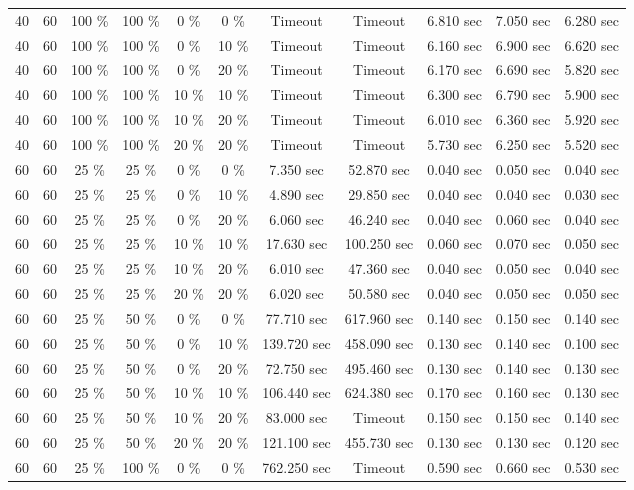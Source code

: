 \documentclass{article}
\begin{document}
\begin{longtable}[]{@{}ccccccccccc@{}}
40 & 60 & 100 \% & 100 \% & 0 \% & 0 \% & Timeout & Timeout & 6.810 sec & 7.050 sec & 6.280 sec \\
40 & 60 & 100 \% & 100 \% & 0 \% & 10 \% & Timeout & Timeout & 6.160 sec & 6.900 sec & 6.620 sec \\
40 & 60 & 100 \% & 100 \% & 0 \% & 20 \% & Timeout & Timeout & 6.170 sec & 6.690 sec & 5.820 sec \\
40 & 60 & 100 \% & 100 \% & 10 \% & 10 \% & Timeout & Timeout & 6.300 sec & 6.790 sec & 5.900 sec \\
40 & 60 & 100 \% & 100 \% & 10 \% & 20 \% & Timeout & Timeout & 6.010 sec & 6.360 sec & 5.920 sec \\
40 & 60 & 100 \% & 100 \% & 20 \% & 20 \% & Timeout & Timeout & 5.730 sec & 6.250 sec & 5.520 sec \\
60 & 60 & 25 \% & 25 \% & 0 \% & 0 \% & 7.350 sec & 52.870 sec & 0.040 sec & 0.050 sec & 0.040 sec \\
60 & 60 & 25 \% & 25 \% & 0 \% & 10 \% & 4.890 sec & 29.850 sec & 0.040 sec & 0.040 sec & 0.030 sec \\
60 & 60 & 25 \% & 25 \% & 0 \% & 20 \% & 6.060 sec & 46.240 sec & 0.040 sec & 0.060 sec & 0.040 sec \\
60 & 60 & 25 \% & 25 \% & 10 \% & 10 \% & 17.630 sec & 100.250 sec & 0.060 sec & 0.070 sec & 0.050 sec \\
60 & 60 & 25 \% & 25 \% & 10 \% & 20 \% & 6.010 sec & 47.360 sec & 0.040 sec & 0.050 sec & 0.040 sec \\
60 & 60 & 25 \% & 25 \% & 20 \% & 20 \% & 6.020 sec & 50.580 sec & 0.040 sec & 0.050 sec & 0.050 sec \\
60 & 60 & 25 \% & 50 \% & 0 \% & 0 \% & 77.710 sec & 617.960 sec & 0.140 sec & 0.150 sec & 0.140 sec \\
60 & 60 & 25 \% & 50 \% & 0 \% & 10 \% & 139.720 sec & 458.090 sec & 0.130 sec & 0.140 sec & 0.100 sec \\
60 & 60 & 25 \% & 50 \% & 0 \% & 20 \% & 72.750 sec & 495.460 sec & 0.130 sec & 0.140 sec & 0.130 sec \\
60 & 60 & 25 \% & 50 \% & 10 \% & 10 \% & 106.440 sec & 624.380 sec & 0.170 sec & 0.160 sec & 0.130 sec \\
60 & 60 & 25 \% & 50 \% & 10 \% & 20 \% & 83.000 sec & Timeout & 0.150 sec & 0.150 sec & 0.140 sec \\
60 & 60 & 25 \% & 50 \% & 20 \% & 20 \% & 121.100 sec & 455.730 sec & 0.130 sec & 0.130 sec & 0.120 sec \\
60 & 60 & 25 \% & 100 \% & 0 \% & 0 \% & 762.250 sec & Timeout & 0.590 sec & 0.660 sec & 0.530 sec \\

\end{longtable}
\end{document}

